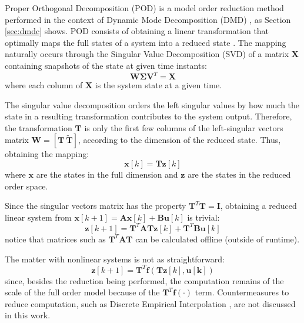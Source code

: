 Proper Orthogonal Decomposition (POD) is a model order reduction method \cite{Jordanou2023} performed in the context of Dynamic Mode Decomposition (DMD) \cite{DMDc}, as Section \ref{sec:dmdc} shows.
%
POD consists of obtaining a linear transformation that optimally maps the full states of a system into a reduced state \cite{Jordanou2023}.
%
The mapping naturally occurs through the Singular Value Decomposition (SVD) of a matrix $\mathbf{X}$ containing snapshots of the state at given time instants:
\begin{equation}
    \mathbf{W}\mathbf{\Sigma}\mathbf{V}^{T} = \mathbf{X}
\end{equation}
where each column of $\mathbf{X}$ is the system state at a given time.

The singular value decomposition orders the left singular values by how much the state in a resulting transformation contributes to the system output.
%
Therefore, the transformation $\mathbf{T}$ is only the first few columns of the left-singular vectors matrix $\mathbf{W}=[\mathbf{T}~\widetilde{\mathbf{T}}]$, according to the dimension of the reduced state.
%
Thus, obtaining the mapping:
\begin{equation}
    \mathbf{x}[k] = \mathbf{T}\mathbf{z}[k]
\end{equation}
where $\mathbf{x}$ are the states in the full dimension and $\mathbf{z}$ are the states in the reduced order space.

Since the singular vectors matrix has the property $\mathbf{T}^T\mathbf{T} = \mathbf{I}$, obtaining a reduced linear system from $\mathbf{x}[k+1] = \mathbf{A}\mathbf{x}[k] + \mathbf{B}\mathbf{u}[k]$ is trivial:
\begin{equation}
   \mathbf{z}[k+1] = \mathbf{T}^T\mathbf{AT}\mathbf{z}[k] + \mathbf{T}^T\mathbf{B}\mathbf{u}[k]
\end{equation}
notice that matrices such as $\mathbf{T}^T\mathbf{AT}$ can be calculated offline (outside of runtime).

The matter with nonlinear systems is not as straightforward:
\begin{equation}
    \mathbf{z}[k+1] = \mathbf{T}^T\mathbf{f}(\mathbf{Tz}[k],\mathbf{u[k]})
\end{equation}
since, besides the reduction being performed, the computation remains of the scale of the full order model because of the $\mathbf{T}^T\mathbf{f}(\cdot)$ term.
%
Countermeasures to reduce computation, such as Discrete Empirical Interpolation \cite{Chatu2010}, are not discussed in this work.

